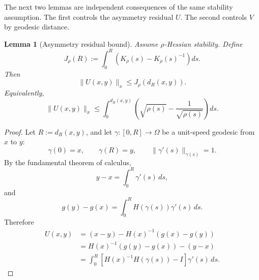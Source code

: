 \documentclass[11pt]{article}
\newtheorem{lemma}{Lemma}
\begin{document}
The next two lemmas are independent consequences of the same stability assumption. The first controls the asymmetry residual \(U\). The second controls \(V\) by geodesic distance.

\begin{lemma}[Asymmetry residual bound]\label{lem:U-bound}
Assume \(\rho\)-Hessian stability. Define
\[
    J_\rho(R):=
    \int_0^R
    \left(
        K_\rho(s)-K_\rho(s)^{-1}
    \right)ds.
\]
Then
\[
    \|U(x,y)\|_x
    \le
    J_\rho(d_R(x,y)).
\]
Equivalently,
\[
    \|U(x,y)\|_x
    \le
    \int_0^{d_R(x,y)}
    \left(
        \sqrt{\rho(s)}
        -
        \frac{1}{\sqrt{\rho(s)}}
    \right)ds.
\]
\end{lemma}

\begin{proof}
Let \(R:=d_R(x,y)\), and let \(\gamma:[0,R]\to\Omega\) be a unit-speed geodesic from \(x\) to \(y\):
\[
    \gamma(0)=x,
    \qquad
    \gamma(R)=y,
    \qquad
    \|\gamma'(s)\|_{\gamma(s)}=1.
\]
By the fundamental theorem of calculus,
\[
    y-x=\int_0^R \gamma'(s)\,ds,
\]
and
\[
    g(y)-g(x)
    =
    \int_0^R H(\gamma(s))\gamma'(s)\,ds.
\]
Therefore
\[
\begin{aligned}
    U(x,y)
    &=
    (x-y)-H(x)^{-1}(g(x)-g(y)) \\
    &=
    H(x)^{-1}(g(y)-g(x))-(y-x) \\
    &=
    \int_0^R
    \left[
        H(x)^{-1}H(\gamma(s))-I
    \right]\gamma'(s)\,ds.
\end{aligned}
\]


\end{proof}
\end{document}
